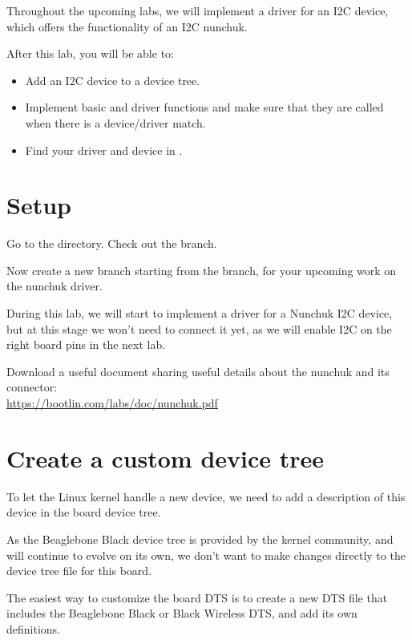 
Throughout the upcoming labs, we will implement a driver for an I2C
device, which offers the functionality of an I2C nunchuk.

After this lab, you will be able to:

\begin{itemize}
\item Add an I2C device to a device tree.
\item Implement basic  and  driver
functions and make sure that they are called when there is a
device/driver match.
\item Find your driver and device in .
\end{itemize}

\section{Setup}

Go to the  directory. Check out the
 branch.

Now create a new  branch starting from the
 branch,  for your upcoming work on the nunchuk
driver.

During this lab, we will start to implement a driver for a
Nunchuk I2C device, but at this stage we won't need to connect
it yet, as we will enable I2C on the right board pins in the
next lab.

Download a useful document sharing useful details about the nunchuk
and its connector:\\
\url{https://bootlin.com/labs/doc/nunchuk.pdf}

\section{Create a custom device tree}

To let the Linux kernel handle a new device, we need to add a
description of this device in the board device tree.

As the Beaglebone Black device tree is provided by the kernel community,
and will continue to evolve on its own, we don't want to make changes
directly to the device tree file for this board.

The easiest way to customize the board DTS is to create a new DTS file
that includes the Beaglebone Black or Black Wireless DTS, and add
its own definitions.

